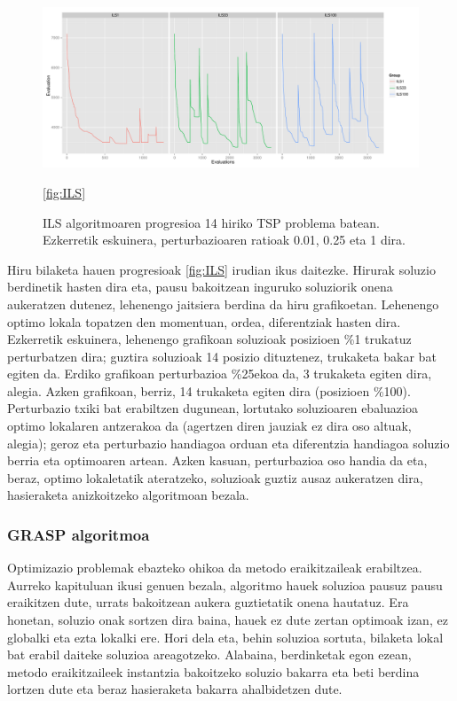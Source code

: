 \documentclass[eu]{ifirak}\usepackage[]{graphicx}\usepackage[]{color}
\begin{document}
\begin{figure}[t]
\includegraphics[width=\textwidth]{./Irudiak/Burma_2-1}
\caption{ILS algoritmoaren progresioa 14 hiriko TSP problema batean. Ezkerretik eskuinera, perturbazioaren ratioak 0.01, 0.25 eta 1 dira.}\ref{fig:ILS}
\end{figure}

Hiru bilaketa hauen progresioak \ref{fig:ILS} irudian ikus daitezke. Hirurak soluzio berdinetik hasten dira eta, pausu bakoitzean inguruko soluziorik onena aukeratzen dutenez, lehenengo jaitsiera berdina da hiru grafikoetan. Lehenengo optimo lokala topatzen den momentuan, ordea, diferentziak hasten dira. Ezkerretik eskuinera, lehenengo grafikoan soluzioak posizioen \%1 trukatuz perturbatzen dira; guztira soluzioak 14 posizio dituztenez, trukaketa bakar bat egiten da. Erdiko grafikoan perturbazioa \%25ekoa da, 3 trukaketa egiten dira, alegia. Azken grafikoan, berriz, 14 trukaketa egiten dira (posizioen \%100). Perturbazio txiki bat erabiltzen dugunean, lortutako soluzioaren ebaluazioa optimo lokalaren antzerakoa da (agertzen diren jauziak  ez dira oso altuak, alegia); geroz eta perturbazio handiagoa orduan eta diferentzia handiagoa soluzio berria eta optimoaren artean. Azken kasuan, perturbazioa oso handia da eta, beraz, optimo lokaletatik ateratzeko, soluzioak guztiz ausaz aukeratzen dira, hasieraketa anizkoitzeko algoritmoan bezala.


\subsubsection{GRASP algoritmoa}

Optimizazio problemak ebazteko ohikoa da metodo eraikitzaileak erabiltzea. Aurreko kapituluan ikusi genuen bezala, algoritmo hauek soluzioa pausuz pausu eraikitzen dute, urrats bakoitzean aukera guztietatik onena hautatuz. Era honetan, soluzio onak sortzen dira baina, hauek ez dute zertan optimoak izan, ez globalki eta ezta lokalki ere. Hori dela eta, behin soluzioa sortuta, bilaketa lokal bat erabil daiteke soluzioa areagotzeko. Alabaina, berdinketak egon ezean, metodo eraikitzaileek instantzia bakoitzeko soluzio bakarra eta beti berdina lortzen dute eta beraz hasieraketa bakarra ahalbidetzen dute.
\end{document}
